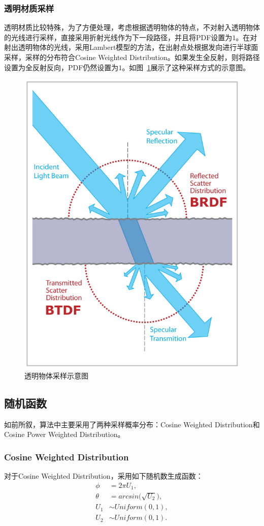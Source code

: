 \documentclass[10pt,a4paper]{article}
\begin{document}
\subsubsection{透明材质采样}
透明材质比较特殊，为了方便处理，考虑根据透明物体的特点，不对射入透明物体的光线进行采样，直接采用折射光线作为下一段路径，并且将PDF设置为$1$。在对射出透明物体的光线，采用Lambert模型的方法，在出射点处根据发向进行半球面采样，采样的分布符合Cosine Weighted Distribution。如果发生全反射，则将路径设置为全反射反向，PDF仍然设置为$1$。如图~\ref{fig:transmitted}展示了这种采样方式的示意图。

\begin{figure}[htbp]
  \centering
  \includegraphics[width=.35\textwidth]{./figs/transmitted.png}
  \caption{透明物体采样示意图}
  \label{fig:transmitted}
\end{figure}

\subsection{随机函数}
如前所叙，算法中主要采用了两种采样概率分布：Cosine Weighted Distribution和Cosine Power Weighted Distribution。

\subsubsection{Cosine Weighted Distribution}
对于Cosine Weighted Distribution，采用如下随机数生成函数：
\begin{equation}
  \begin{split}
    \phi &= 2\pi U_1,  \\
    \theta &= arcsin\big(\sqrt{U_2}\big), \\
    U_1 &\sim Uniform(0, 1),  \\
    U_2 &\sim Uniform(0, 1).
  \end{split}
\end{equation}
\end{document}
